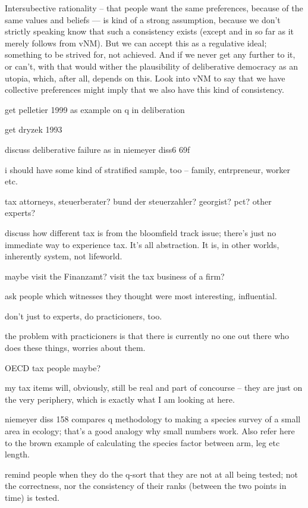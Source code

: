 Intersubective rationality -- that people want the same preferences, because of the same values and beliefs –-- is kind of a strong assumption, because we don't strictly speaking know that such a consistency exists (except and in so far as it merely follows from vNM). But we can accept this as a regulative ideal; something to be strived for, not achieved. And if we never get any further to it, or can't, with that would wither the plausibility of deliberative democracy as an utopia, which, after all, depends on this.
Look into vNM to say that we have collective preferences might imply that we also have this kind of consistency.

get pelletier 1999 as example on q in deliberation

get dryzek 1993

discuss deliberative failure as in niemeyer diss6 69f

i should have some kind of stratified sample, too -- family, entrpreneur, worker etc.

tax attorneys, steuerberater?
bund der steuerzahler?
georgist?
pct?
other experts?

discuss how different tax is from the bloomfield track issue; there's just no immediate way to experience tax. It's all abstraction.
It is, in other worlds, inherently system, not lifeworld.

maybe visit the Finanzamt?
visit the tax business of a firm?

ask people which witnesses they thought were most interesting, influential.

don't just to experts, do practicioners, too.

the problem with practicioners is that there is currently no one out there who does these things, worries about them.

OECD tax people maybe?

my tax items will, obviously, still be real and part of concourse – they are just on the very periphery, which is exactly what I am looking at here.

niemeyer diss 158 compares q methodology to making a species survey of a small area in ecology; that's a good analogy why small numbers work. Also refer here to the brown example of calculating the species factor between arm, leg etc length.

remind people when they do the q-sort that they are not at all being tested; not the correctness, nor the consistency of their ranks (between the two points in time) is tested.

